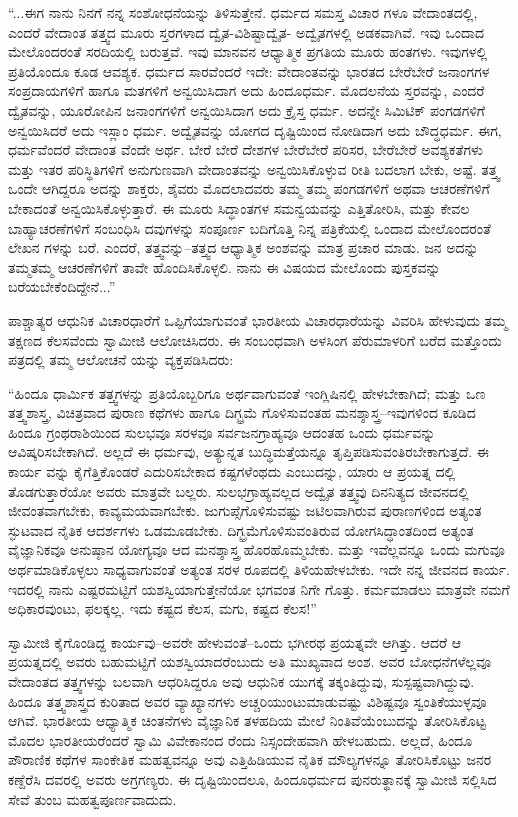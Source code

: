 “...ಈಗ ನಾನು ನಿನಗೆ ನನ್ನ ಸಂಶೋಧನೆಯನ್ನು ತಿಳಿಸುತ್ತೇನೆ. ಧರ್ಮದ ಸಮಸ್ತ ವಿಚಾರ ಗಳೂ ವೇದಾಂತದಲ್ಲಿ, ಎಂದರೆ ವೇದಾಂತ ತತ್ತ್ವದ ಮೂರು ಸ್ತರಗಳಾದ ದ್ವೈತ-ವಿಶಿಷ್ಟಾದ್ವೈತ- ಅದ್ವೈತಗಳಲ್ಲಿ ಅಡಕವಾಗಿವೆ. ಇವು ಒಂದಾದ ಮೇಲೊಂದರಂತೆ ಸರದಿಯಲ್ಲಿ ಬರುತ್ತವೆ. ಇವು ಮಾನವನ ಆಧ್ಯಾತ್ಮಿಕ ಪ್ರಗತಿಯ ಮೂರು ಹಂತಗಳು. ಇವುಗಳಲ್ಲಿ ಪ್ರತಿಯೊಂದೂ ಕೂಡ ಆವಶ್ಯಕ. ಧರ್ಮದ ಸಾರವೆಂದರೆ ಇದೇ: ವೇದಾಂತವನ್ನು ಭಾರತದ ಬೇರೆಬೇರೆ ಜನಾಂಗಗಳ ಸಂಪ್ರದಾಯಗಳಿಗೆ ಹಾಗೂ ಮತಗಳಿಗೆ ಅನ್ವಯಿಸಿದಾಗ ಅದು ಹಿಂದೂಧರ್ಮ. ಮೊದಲನೆಯ ಸ್ತರವನ್ನು, ಎಂದರೆ ದ್ವೈತವನ್ನು, ಯೂರೋಪಿನ ಜನಾಂಗಗಳಿಗೆ ಅನ್ವಯಿಸಿದಾಗ ಅದು ಕ್ರೈಸ್ತ ಧರ್ಮ. ಅದನ್ನೇ ಸಿಮಿಟಿಕ್ ಪಂಗಡಗಳಿಗೆ ಅನ್ವಯಿಸಿದರೆ ಅದು ಇಸ್ಲಾಂ ಧರ್ಮ. ಅದ್ವೈತವನ್ನು ಯೋಗದ ದೃಷ್ಟಿಯಿಂದ ನೋಡಿದಾಗ ಅದು ಬೌದ್ಧಧರ್ಮ. ಈಗ, ಧರ್ಮವೆಂದರೆ ವೇದಾಂತ ವೆಂದೇ ಅರ್ಥ. ಬೇರೆ ಬೇರೆ ದೇಶಗಳ ಬೇರೆಬೇರೆ ಪರಿಸರ, ಬೇರೆಬೇರೆ ಅವಶ್ಯಕತೆಗಳು ಮತ್ತು ಇತರ ಪರಿಸ್ಥಿತಿಗಳಿಗೆ ಅನುಗುಣವಾಗಿ ವೇದಾಂತವನ್ನು ಅನ್ವಯಿಸಿಕೊಳ್ಳುವ ರೀತಿ ಬದಲಾಗ ಬೇಕು, ಅಷ್ಟೆ. ತತ್ತ್ವ ಒಂದೇ ಆಗಿದ್ದರೂ ಅದನ್ನು ಶಾಕ್ತರು, ಶೈವರು ಮೊದಲಾದವರು ತಮ್ಮ ತಮ್ಮ ಪಂಗಡಗಳಿಗೆ ಅಥವಾ ಆಚರಣೆಗಳಿಗೆ ಬೇಕಾದಂತೆ ಅನ್ವಯಿಸಿಕೊಳ್ಳುತ್ತಾರೆ. ಈ ಮೂರು ಸಿದ್ಧಾಂತಗಳ ಸಮನ್ವಯವನ್ನು ಎತ್ತಿತೋರಿಸಿ, ಮತ್ತು ಕೇವಲ ಬಾಹ್ಯಾಚರಣೆಗಳಿಗೆ ಸಂಬಂಧಿಸಿ ದವುಗಳನ್ನು ಸಂಪೂರ್ಣ ಬದಿಗೊತ್ತಿ ನಿನ್ನ ಪತ್ರಿಕೆಯಲ್ಲಿ ಒಂದಾದ ಮೇಲೊಂದರಂತೆ ಲೇಖನ ಗಳನ್ನು ಬರೆ. ಎಂದರೆ, ತತ್ತ್ವವನ್ನು–ತತ್ತ್ವದ ಆಧ್ಯಾತ್ಮಿಕ ಅಂಶವನ್ನು ಮಾತ್ರ ಪ್ರಚಾರ ಮಾಡು. ಜನ ಅದನ್ನು ತಮ್ಮತಮ್ಮ ಆಚರಣೆಗಳಿಗೆ ತಾವೇ ಹೊಂದಿಸಿಕೊಳ್ಳಲಿ. ನಾನು ಈ ವಿಷಯದ ಮೇಲೊಂದು ಪುಸ್ತಕವನ್ನು ಬರೆಯಬೇಕೆಂದಿದ್ದೇನೆ...”

ಪಾಶ್ಚಾತ್ಯರ ಆಧುನಿಕ ವಿಚಾರಧಾರೆಗೆ ಒಪ್ಪಿಗೆಯಾಗುವಂತೆ ಭಾರತೀಯ ವಿಚಾರಧಾರೆಯನ್ನು ವಿವರಿಸಿ ಹೇಳುವುದು ತಮ್ಮ ತಕ್ಷಣದ ಕೆಲಸವೆಂದು ಸ್ವಾಮೀಜಿ ಆಲೋಚಿಸಿದರು. ಈ ಸಂಬಂಧವಾಗಿ ಅಳಸಿಂಗ ಪೆರುಮಾಳರಿಗೆ ಬರೆದ ಮತ್ತೊಂದು ಪತ್ರದಲ್ಲಿ ತಮ್ಮ ಆಲೋಚನೆ ಯನ್ನು ವ್ಯಕ್ತಪಡಿಸಿದರು:

“ಹಿಂದೂ ಧಾರ್ಮಿಕ ತತ್ತ್ವಗಳನ್ನು ಪ್ರತಿಯೊಬ್ಬರಿಗೂ ಅರ್ಥವಾಗುವಂತೆ ಇಂಗ್ಲಿಷಿನಲ್ಲಿ ಹೇಳಬೇಕಾಗಿದೆ; ಮತ್ತು ಒಣ ತತ್ತ್ವಶಾಸ್ತ್ರ, ವಿಚಿತ್ರವಾದ ಪುರಾಣ ಕಥೆಗಳು ಹಾಗೂ ದಿಗ್ಭ್ರಮೆ ಗೊಳಿಸುವಂತಹ ಮನಶ್ಶಾಸ್ತ್ರ–ಇವುಗಳಿಂದ ಕೂಡಿದ ಹಿಂದೂ ಗ್ರಂಥರಾಶಿಯಿಂದ ಸುಲಭವೂ ಸರಳವೂ ಸರ್ವಜನಗ್ರಾಹ್ಯವೂ ಆದಂತಹ ಒಂದು ಧರ್ಮವನ್ನು ಆವಿಷ್ಕರಿಸಬೇಕಾಗಿದೆ. ಅಲ್ಲದೆ ಈ ಧರ್ಮವು, ಅತ್ಯುನ್ನತ ಬುದ್ಧಿಮತ್ತೆಯನ್ನೂ ತೃಪ್ತಿಪಡಿಸುವಂತಿರಬೇಕಾಗುತ್ತದೆ. ಈ ಕಾರ್ಯ ವನ್ನು ಕೈಗೆತ್ತಿಕೊಂಡರೆ ಎದುರಿಸಬೇಕಾದ ಕಷ್ಟಗಳೆಂಥದು ಎಂಬುದನ್ನು, ಯಾರು ಆ ಪ್ರಯತ್ನ ದಲ್ಲಿ ತೊಡಗುತ್ತಾರೆಯೋ ಅವರು ಮಾತ್ರವೇ ಬಲ್ಲರು. ಸುಲಭಗ್ರಾಹ್ಯವಲ್ಲದ ಅದ್ವೈತ ತತ್ತ್ವವು ದಿನನಿತ್ಯದ ಜೀವನದಲ್ಲಿ ಜೀವಂತವಾಗಬೇಕು, ಕಾವ್ಯಮಯವಾಗಬೇಕು. ಜುಗುಪ್ಸೆಗೊಳಿಸುವಷ್ಟು ಜಟಿಲವಾಗಿರುವ ಪುರಾಣಗಳಿಂದ ಅತ್ಯಂತ ಸ್ಫುಟವಾದ ನೈತಿಕ ಆದರ್ಶಗಳು ಒಡಮೂಡಬೇಕು. ದಿಗ್ಭ್ರಮೆಗೊಳಿಸುವಂತಿರುವ ಯೋಗಸಿದ್ಧಾಂತದಿಂದ ಅತ್ಯಂತ ವೈಜ್ಞಾನಿಕವೂ ಅನುಷ್ಠಾನ ಯೋಗ್ಯವೂ ಆದ ಮನಶ್ಶಾಸ್ತ್ರ ಹೊರಹೊಮ್ಮಬೇಕು. ಮತ್ತು ಇವೆಲ್ಲವನ್ನೂ ಒಂದು ಮಗುವೂ ಅರ್ಥಮಾಡಿಕೊಳ್ಳಲು ಸಾಧ್ಯವಾಗುವಂತೆ ಅತ್ಯಂತ ಸರಳ ರೂಪದಲ್ಲಿ ತಿಳಿಯಹೇಳಬೇಕು. ಇದೇ ನನ್ನ ಜೀವನದ ಕಾರ್ಯ. ಇದರಲ್ಲಿ ನಾನು ಎಷ್ಟರಮಟ್ಟಿಗೆ ಯಶಸ್ವಿಯಾಗುತ್ತೇನೆಯೋ ಭಗವಂತ ನಿಗೇ ಗೊತ್ತು. ಕರ್ಮಮಾಡಲು ಮಾತ್ರವೇ ನಮಗೆ ಅಧಿಕಾರವುಂಟು, ಫಲಕ್ಕಲ್ಲ. ಇದು ಕಷ್ಟದ ಕೆಲಸ, ಮಗು, ಕಷ್ಟದ ಕೆಲಸ!”

ಸ್ವಾಮೀಜಿ ಕೈಗೊಂಡಿದ್ದ ಕಾರ್ಯವು–ಅವರೇ ಹೇಳುವಂತೆ–ಒಂದು ಭಗೀರಥ ಪ್ರಯತ್ನವೇ ಆಗಿತ್ತು. ಆದರೆ ಆ ಪ್ರಯತ್ನದಲ್ಲಿ ಅವರು ಬಹುಮಟ್ಟಿಗೆ ಯಶಸ್ವಿಯಾದರೆಂಬುದು ಅತಿ ಮುಖ್ಯವಾದ ಅಂಶ. ಅವರ ಬೋಧನೆಗಳೆಲ್ಲವೂ ವೇದಾಂತದ ತತ್ತ್ವಗಳನ್ನು ಬಲವಾಗಿ ಆಧರಿಸಿದ್ದರೂ ಅವು ಆಧುನಿಕ ಯುಗಕ್ಕೆ ತಕ್ಕಂತಿದ್ದುವು, ಸುಸ್ಪಷ್ಟವಾಗಿದ್ದುವು. ಹಿಂದೂ ತತ್ತ್ವಶಾಸ್ತ್ರದ ಕುರಿತಾದ ಅವರ ವ್ಯಾಖ್ಯಾನಗಳು ಅಚ್ಚರಿಯುಂಟುಮಾಡುವಷ್ಟು ವಿಶಿಷ್ಟವೂ ಸ್ವಂತಿಕೆಯುಳ್ಳವೂ ಆಗಿವೆ. ಭಾರತೀಯ ಆಧ್ಯಾತ್ಮಿಕ ಚಿಂತನೆಗಳು ವೈಜ್ಞಾನಿಕ ತಳಹದಿಯ ಮೇಲೆ ನಿಂತಿವೆಯೆಂಬುದನ್ನು ತೋರಿಸಿಕೊಟ್ಟ ಮೊದಲ ಭಾರತೀಯರೆಂದರೆ ಸ್ವಾಮಿ ವಿವೇಕಾನಂದ ರೆಂದು ನಿಸ್ಸಂದೇಹವಾಗಿ ಹೇಳಬಹುದು. ಅಲ್ಲದೆ, ಹಿಂದೂ ಪೌರಾಣಿಕ ಕಥೆಗಳ ಸಾಂಕೇತಿಕ ಮಹತ್ವವನ್ನೂ ಅವು ಎತ್ತಿಹಿಡಿಯುವ ನೈತಿಕ ಮೌಲ್ಯಗಳನ್ನೂ ತೋರಿಸಿಕೊಟ್ಟು ಜನರ ಕಣ್ದೆರೆಸಿ ದವರಲ್ಲಿ ಅವರು ಅಗ್ರಗಣ್ಯರು. ಈ ದೃಷ್ಟಿಯಿಂದಲೂ, ಹಿಂದೂಧರ್ಮದ ಪುನರುತ್ಥಾನಕ್ಕೆ ಸ್ವಾಮೀಜಿ ಸಲ್ಲಿಸಿದ ಸೇವೆ ತುಂಬ ಮಹತ್ವಪೂರ್ಣವಾದುದು.

